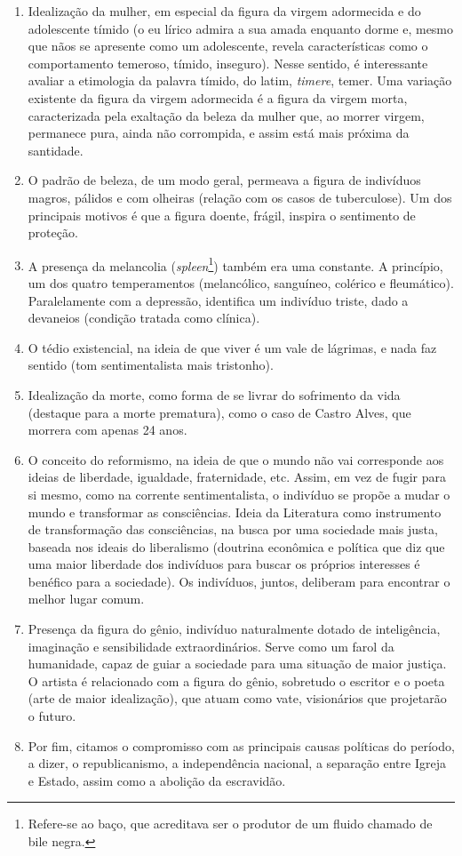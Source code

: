 \begin{enumerate}
\item Idealização da mulher, em especial da figura da virgem adormecida e do adolescente tímido (o eu lírico admira a sua amada enquanto dorme e, mesmo que nãos se apresente como um adolescente, revela características como o comportamento temeroso, tímido, inseguro). Nesse sentido, é interessante avaliar a etimologia da palavra tímido, do latim, \textit{timere}, temer. Uma variação existente da figura da virgem adormecida é a figura da virgem morta, caracterizada pela exaltação da beleza da mulher que, ao morrer virgem, permanece pura, ainda não corrompida, e assim está mais próxima da santidade.
\item O padrão de beleza, de um modo geral, permeava a figura de indivíduos magros,  pálidos e com olheiras (relação com os casos de tuberculose). Um dos principais motivos é que a figura doente, frágil, inspira o sentimento de proteção.
\item A presença da melancolia (\textit{spleen}\footnote{Refere-se ao baço, que acreditava ser o produtor de um fluido chamado de bile negra.}) também era uma constante. A princípio, um dos quatro temperamentos (melancólico, sanguíneo, colérico e fleumático). Paralelamente com a depressão, identifica um indivíduo triste, dado a devaneios (condição tratada como clínica).
\item O tédio existencial, na ideia de que viver é um vale de lágrimas, e nada faz sentido (tom sentimentalista mais tristonho).
\item Idealização da morte, como forma de se livrar do sofrimento da vida (destaque para a morte prematura), como o caso de Castro Alves, que morrera com apenas 24 anos.
\item O conceito do reformismo, na ideia de que o mundo não vai corresponde aos ideias de liberdade, igualdade, fraternidade, etc. Assim, em vez de fugir para si mesmo, como na corrente sentimentalista, o indivíduo se propõe a mudar o mundo e transformar as consciências. Ideia da Literatura como instrumento de transformação das consciências, na busca por uma sociedade mais justa, baseada nos ideais do liberalismo (doutrina econômica e política que diz que uma maior liberdade dos indivíduos para buscar os próprios interesses é benéfico para a sociedade). Os indivíduos, juntos, deliberam para encontrar o melhor lugar comum.
\item Presença da figura do gênio, indivíduo naturalmente dotado de inteligência, imaginação e sensibilidade extraordinários. Serve como um farol da humanidade, capaz de guiar a sociedade para uma situação de maior justiça. O artista é relacionado com a figura do gênio, sobretudo o escritor e o poeta (arte de maior idealização), que atuam como vate, visionários que projetarão o futuro.
\item Por fim, citamos o compromisso com as principais causas políticas do período, a dizer, o republicanismo, a independência nacional, a separação entre Igreja e Estado, assim como a abolição da escravidão.
\end{enumerate}

